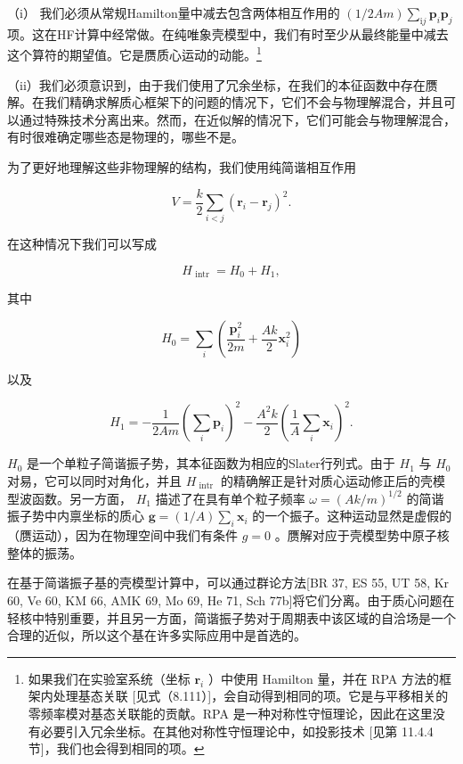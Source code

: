 （i） 我们必须从常规Hamilton量中减去包含两体相互作用的 $\left({1/{2Am}}\right)\mathop{\sum}\limits_{{\mathrm{i}j}}{\boldsymbol{p}}_{i}{\boldsymbol{p}}_{j}$
项。这在HF计算中经常做。在纯唯象壳模型中，我们有时至少从最终能量中减去这个算符的期望值。它是赝质心运动的动能。\footnote{如果我们在实验室系统（坐标 $\boldsymbol{r}_{i}$ ）中使用 Hamilton 量，并在 RPA 方法的框架内处理基态关联
{[}见式（8.111）{]}，会自动得到相同的项。它是与平移相关的零频率模对基态关联能的贡献。RPA 是一种对称性守恒理论，因此在这里没有必要引入冗余坐标。在其他对称性守恒理论中，如投影技术
{[}见第 11.4.4 节{]}，我们也会得到相同的项。}

（ii）我们必须意识到，由于我们使用了冗余坐标，在我们的本征函数中存在赝解。在我们精确求解质心框架下的问题的情况下，它们不会与物理解混合，并且可以通过特殊技术分离出来。然而，在近似解的情况下，它们可能会与物理解混合，有时很难确定哪些态是物理的，哪些不是。

为了更好地理解这些非物理解的结构，我们使用纯简谐相互作用\cite{GS57}

\[
V=\frac{k}{2}\mathop{\sum}\limits_{{i<j}}{\left({\boldsymbol{r}}_{i}-{\boldsymbol{r}}_{j}\right)}^{2}.\tag{11.43}
\]

在这种情况下我们可以写成

\[
{H}_{\text{ intr }}={H}_{0}+{H}_{1},\tag{11.44}
\]

其中

\[
{H}_{0}=\mathop{\sum}\limits_{i}\left({\frac{{\boldsymbol{p}}^{2}_{i}}{2m}+\frac{Ak}{2}{\boldsymbol{x}}^{2}_{i}}\right)\tag{11.45}
\]

以及

\[
{H}_{1}=-\frac{1}{2Am}{\left(\sum_{i}\boldsymbol{p}_{i}\right)}^{2}-\frac{A^{2}k}{2}{\left(\frac{1}{A}\sum_{i}\boldsymbol{x}_{i}\right)}^{2}.\tag{11.46}
\]

${H}_{0}$ 是一个单粒子简谐振子势，其本征函数为相应的Slater行列式。由于 ${H}_{1}$ 与 ${H}_{0}$
对易，它可以同时对角化，并且 ${H}_{\text{ intr }}$ 的精确解正是针对质心运动修正后的壳模型波函数。另一方面，
${H}_{1}$ 描述了在具有单个粒子频率 $\omega={\left(Ak/m\right)}^{1/2}$ 的简谐振子势中内禀坐标的质心
$\boldsymbol{g}=\left({1/A}\right)\mathop{\sum}\limits_{i}{\boldsymbol{x}}_{i}$
的一个振子。这种运动显然是虚假的（赝运动），因为在物理空间中我们有条件 $g=0$ 。赝解对应于壳模型势中原子核整体的振荡。

在基于简谐振子基的壳模型计算中，可以通过群论方法{[}BR 37, ES 55, UT 58, Kr 60, Ve 60, KM 66,
AMK 69, Mo 69, He 71, Sch 77b{]}将它们分离。由于质心问题在轻核中特别重要，并且另一方面，简谐振子势对于周期表中该区域的自洽场是一个合理的近似，所以这个基在许多实际应用中是首选的。

